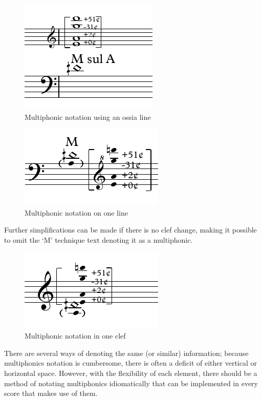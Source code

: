 \begin{figure}
  \centering
  \includegraphics{./resources/multiphonicNotationOssia.pdf}
  \caption{Multiphonic notation using an ossia line}\label{fig:multiphonicNotationOssia}
\end{figure}

\begin{figure}
  \centering
  \includegraphics{./resources/multiphonicNotationOneLine.pdf}
  \caption{Multiphonic notation on one line}\label{fig:multiphonicNotationOneLine}
\end{figure}

Further simplifications can be made if there is no clef change, making it possible to omit the `M' technique text denoting it as a multiphonic.

\begin{figure}
  \centering
  \includegraphics{./resources/multiphonicNotationOneLineClef.pdf}
  \caption{Multiphonic notation in one clef}\label{fig:multiphonicNotationOneLineClef}
\end{figure}

There are several ways of denoting the same (or similar) information; because multiphonics notation is cumbersome, there is often a deficit of either vertical or horizontal space.
However, with the flexibility of each element, there should be a method of notating multiphonics idiomatically that can be implemented in every score that makes use of them.


